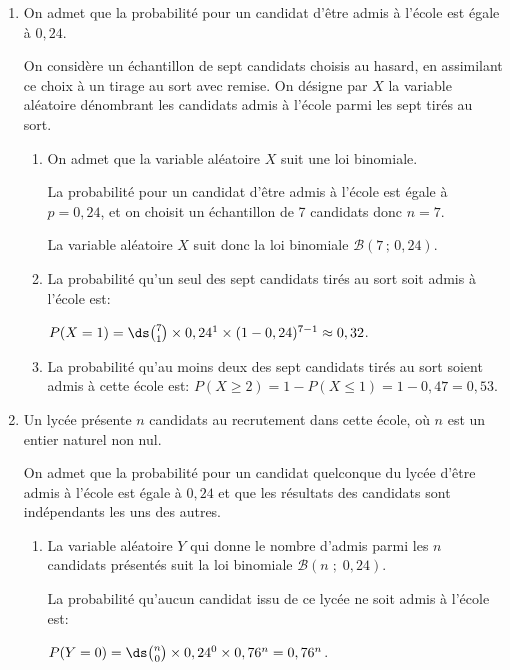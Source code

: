 \begin{enumerate}
\item On admet que la probabilité pour un candidat d'être admis à l'école est égale à $0,24$.

On considère un échantillon de sept candidats choisis au hasard, en assimilant ce choix à un tirage au sort avec remise. On désigne par $X$ la variable aléatoire dénombrant les candidats admis à l'école parmi les sept tirés au sort.
	\begin{enumerate}
		\item On admet que la variable aléatoire $X$ suit une loi binomiale. %
		
La probabilité pour un candidat d'être admis à l'école est égale à $p=0,24$, et on choisit un échantillon de 7 candidats donc $n=7$.

La variable aléatoire $X$ suit donc la loi binomiale $\mathcal{B}\left (7\,;\,0,24\right )$.
		
		\item La probabilité qu'un seul des sept candidats tirés au sort soit admis à l'école est:
		
$P(X=1)= \ds\binom{7}{1}\times 0,24^1 \times (1-0,24)^{7-1} \approx 0,32$.		
		
		\item La probabilité qu'au moins deux des sept candidats tirés au sort soient admis à cette école est: $P(X\geqslant 2) = 1-P(X\leqslant 1) = 1-0,47=0,53$.		
		
	\end{enumerate}
	
\item  Un lycée présente $n$ candidats au recrutement dans cette école, où $n$ est un entier naturel non nul.

On admet que la probabilité pour un candidat quelconque du lycée d'être admis à l'école est égale à $0,24$ et que les résultats des candidats sont indépendants les uns des autres.

	\begin{enumerate}
		\item La variable aléatoire $Y$ qui donne le nombre d'admis parmi les $n$ candidats présentés suit la loi binomiale $\mathcal{B}\left (n\;;\;0,24\right )$.
		
		 La probabilité qu'aucun candidat issu de ce lycée ne soit admis à l'école est:
		
$P(Y=0) = \ds\binom{n}{0}\times 0,24^0 \times 0,76^n=0,76^n$.		
		

\end{enumerate}
\end{enumerate}
